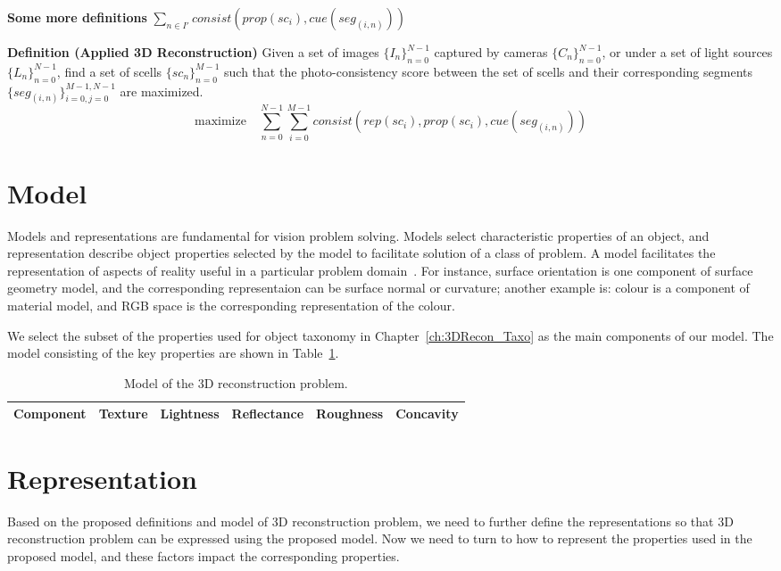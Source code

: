 \textbf{Some more definitions} $\sum_{n\in I'}consist(prop(sc_i), cue(seg_{(i, n)}))$

\textbf{Definition (Applied 3D Reconstruction)} Given a set of images $\{I_n\}_{n=0}^{N-1}$ captured by cameras $\{C_n\}_{n=0}^{N-1}$, or under a set of light sources $\{L_n\}_{n=0}^{N-1}$, find a set of scells $\{sc_n\}_{n=0}^{M-1}$ such that the photo-consistency score between the set of scells and their corresponding segments $\{seg_{(i, n)}\}_{i=0,j=0}^{M-1,N-1}$ are maximized.
$$
\mbox{maximize} \quad \sum_{n=0}^{N-1}\sum_{i=0}^{M-1} consist(rep(sc_i), prop(sc_i), cue(seg_{(i, n)}))
$$

\section{Model}
\label{sec:3DRecon_Model}
Models and representations are fundamental for vision problem solving. Models select characteristic properties of an object, and representation describe object properties selected by the model to facilitate solution of a class of problem. A model facilitates the representation of aspects of reality useful in a particular problem domain~\cite{bolles19863dpo}. For instance, surface orientation is one component of surface geometry model, and the corresponding representaion can be surface normal or curvature; another example is: colour is a component of material model, and RGB space is the corresponding representation of the colour.

We select the subset of the properties used for object taxonomy in Chapter~\ref{ch:3DRecon_Taxo} as the main components of our model. The model consisting of the key properties are shown in Table~\ref{tab:3DRecon_model}.
\begin{table}[h]
  \centering
  \begin{tabular}{l|*{5}{c}}
  \hline
  \textbf{Component} & Texture & Lightness & Reflectance & Roughness & Concavity\\
  \hline
  \end{tabular}
  \caption{Model of the 3D reconstruction problem.}
  \label{tab:3DRecon_model}
\end{table}

\section{Representation}
\label{sec:3DRecon_Rep}
Based on the proposed definitions and model of 3D reconstruction problem, we need to further define the representations so that 3D reconstruction problem can be expressed using the proposed model. Now we need to turn to how to represent the properties used in the proposed model, and these factors impact the corresponding properties.

